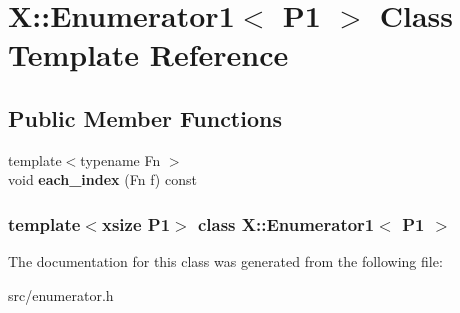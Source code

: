 \hypertarget{class_x_1_1_enumerator1}{\section{X\-:\-:Enumerator1$<$ P1 $>$ Class Template Reference}
\label{class_x_1_1_enumerator1}
}
\subsection*{Public Member Functions}
\begin{DoxyCompactItemize}
\item 
\hypertarget{class_x_1_1_enumerator1_ab9ac1342d0ad82b938afa6daa705bafc}{{\footnotesize template$<$typename Fn $>$ }\\void {\bfseries each\-\_\-index} (Fn f) const }\label{class_x_1_1_enumerator1_ab9ac1342d0ad82b938afa6daa705bafc}

\end{DoxyCompactItemize}
\subsubsection*{template$<$xsize P1$>$ class X\-::\-Enumerator1$<$ P1 $>$}



The documentation for this class was generated from the following file\-:\begin{DoxyCompactItemize}
\item 
src/enumerator.\-h\end{DoxyCompactItemize}
